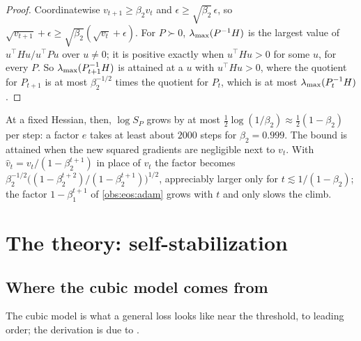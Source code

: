 \begin{refsection}

\begin{proof}
Coordinatewise $v_{t+1}\ge\beta_2v_t$ and $\epsilon\ge\sqrt{\beta_2}\,\epsilon$, so $\sqrt{v_{t+1}}+\epsilon\ge\sqrt{\beta_2}(\sqrt{v_t}+\epsilon)$. For $P\succ0$, $\lambda_{\max}(P^{-1}H)$ is the largest value of $u^\top Hu/u^\top Pu$ over $u\ne0$; it is positive exactly when $u^\top Hu>0$ for some $u$, for every $P$. So $\lambda_{\max}(P_{t+1}^{-1}H)$ is attained at a $u$ with $u^\top Hu>0$, where the quotient for $P_{t+1}$ is at most $\beta_2^{-1/2}$ times the quotient for $P_t$, which is at most $\lambda_{\max}(P_t^{-1}H)$.
\end{proof}

At a fixed Hessian, then, $\log S_P$ grows by at most $\frac12\log(1/\beta_2)\approx\frac12(1-\beta_2)$ per step: a factor $e$ takes at least about $2000$ steps for $\beta_2=0.999$. The bound is attained when the new squared gradients are negligible next to $v_t$. With $\hat v_t=v_t/(1-\beta_2^{t+1})$ in place of $v_t$ the factor becomes $\beta_2^{-1/2}\bigl((1-\beta_2^{t+2})/(1-\beta_2^{t+1})\bigr)^{1/2}$, appreciably larger only for $t\lesssim1/(1-\beta_2)$; the factor $1-\beta_1^{t+1}$ of \cref{obs:eos:adam} grows with $t$ and only slows the climb.

\section{The theory: self-stabilization}\label{sec:eos:selfstab}

\subsection{Where the cubic model comes from}

The cubic model is what a general loss looks like near the threshold, to leading order; the derivation is due to \textcite{DamianNichaniLee2023}.


\end{refsection}
